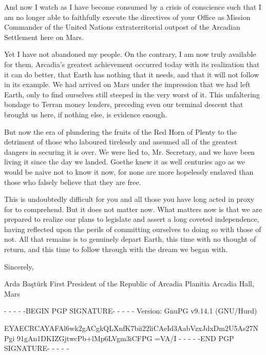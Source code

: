 And now I watch as I have become consumed by a crisis of conscience such that I am no longer able to faithfully execute the directives of your Office as Mission Commander of the United Nations extraterritorial outpost of the Arcadian Settlement here on Mars.

Yet I have not abandoned my people. On the contrary, I am now truly available for them. Arcadia's greatest achievement occurred today with its realization that it can do better, that Earth has nothing that it needs, and that it will not follow in its example. We had arrived on Mars under the impression that we had left Earth, only to find ourselves still steeped in the very worst of it. This unfaltering bondage to Terran money lenders, preceding even our terminal descent that brought us here, if nothing else, is evidence enough.

But now the era of plundering the fruits of the Red Horn of Plenty to the detriment of those who laboured tirelessly and assumed all of the greatest dangers in securing it is over. We were lied to, Mr. Secretary, and we have been living it since the day we landed. Goethe knew it as well centuries ago as we would be naive not to know it now, for none are more hopelessly enslaved than those who falsely believe that they are free.

This is undoubtedly difficult for you and all those you have long acted in proxy for to comprehend. But it does not matter now. What matters now is that we are prepared to realize our plans to legislate and assert a long coveted independence, having reflected upon the perils of committing ourselves to doing so with those of not. All that remains is to genuinely depart Earth, this time with no thought of return, and this time to follow through with the dream we began with.

Sincerely, 

\hskip 1.5cm 
   
Arda Baştürk
First President of the Republic of Arcadia Planitia
Arcadia Hall, Mars

- - - - -BEGIN PGP SIGNATURE- - - - -
Version: GnuPG v9.14.1 (GNU/Hurd)

EYAECRCAYAFAl6wk2gACgkQLXnfK7bii22liCAeId3AabVzxJdxDm2U5As27NPgi
91gAn1DKIZGjtwcPb+lMp6LVgm3iCFPG
=VA/I
- - - - -END PGP SIGNATURE- - - - -
\stoplines

